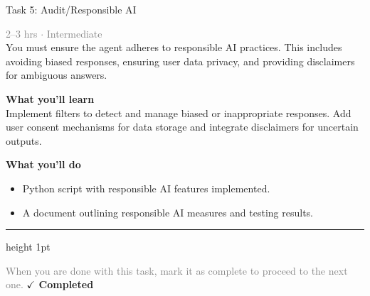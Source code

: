 \documentclass[10pt,a4paper]{article}
\begin{document}
\begin{taskbox}{Task 5: Audit/Responsible AI}

    {\small \textcolor{gray}{2--3 hrs $\cdot$ Intermediate}}\\[12pt]

      
You must ensure the agent adheres to responsible AI practices. This includes avoiding biased responses, ensuring user data privacy, and providing disclaimers for ambiguous answers.


\vspace{8pt}
{\large \textbf{\textcolor{brandLight}{What you'll learn}}}\\[4pt]  
Implement filters to detect and manage biased or inappropriate responses. Add user consent mechanisms for data storage and integrate disclaimers for uncertain outputs.

\vspace{8pt}
{\large \textbf{\textcolor{brandLight}{What you'll do}}}\\[4pt]  
\begin{itemize}
    \item Python script with responsible AI features implemented.  
    \item A document outlining responsible AI measures and testing results.\par
\end{itemize}

    \vspace{16pt}

    \textcolor{cardBorder}{\hrule height 1pt}\vspace{8pt}

    \small \textcolor{gray}{When you are done with this task, mark it as complete to proceed to the next one.} \hfill \textbf{\textcolor{brandDark}{$\checkmark$ Completed}}

\end{taskbox}
\end{document}
